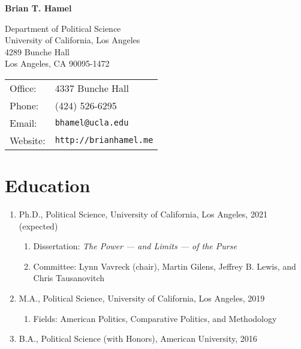 \documentclass[12pt]{article}
\def\name{\textbf{Brian T. Hamel}}
\begin{document}
{\huge \name}


\vspace{0.25in}

\begin{minipage}{0.5\linewidth}
  Department of Political Science \\
  University of California, Los Angeles \\
  4289 Bunche Hall \\
  Los Angeles, CA 90095-1472 
\end{minipage}
\begin{minipage}{0.5\linewidth}
  \begin{tabular}{ll}
    Office: & 4337 Bunche Hall \\
    Phone: & (424) 526-6295 \\
    Email: & \texttt{bhamel@ucla.edu} \\
    Website: & \texttt{http://brianhamel.me} \\
  \end{tabular}
\end{minipage}

\section*{Education}

\begin{enumerate}[topsep = 0pt, itemsep = 1ex, partopsep  = 1ex, parsep = 1ex]

	\item[] Ph.D., Political Science, University of California, Los Angeles, 2021 (expected)
		
	\begin{enumerate}[topsep = 0pt, itemsep = -1ex, partopsep = -1ex, parsep = 1ex]
	
		\item[] Dissertation: \textit{The Power --- and Limits --- of the Purse}
		
		\item[] Committee: Lynn Vavreck (chair), Martin Gilens, Jeffrey B. Lewis, and Chris Tausanovitch
	
	\end{enumerate}
		
	\item[] M.A., Political Science, University of California, Los Angeles, 2019
	
	\begin{enumerate}[topsep = 0pt, itemsep = -1ex, partopsep  = -1ex, parsep = 1ex]
	
		\item[] Fields: American Politics, Comparative Politics, and Methodology
	
	\end{enumerate}
		
	\item[] B.A., Political Science (with Honors), American University, 2016

\end{enumerate}
\end{document}
